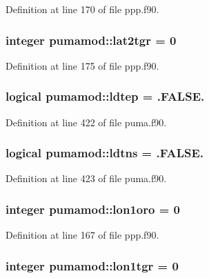 \-Definition at line 170 of file ppp.\-f90.

\hypertarget{classpumamod_a3f3522edc6079ba74938bdcf2a780610}{
\subsubsection[{lat2tgr}]{\setlength{\rightskip}{0pt plus 5cm}integer {\bf pumamod\-::lat2tgr} = 0}}
\label{classpumamod_a3f3522edc6079ba74938bdcf2a780610}


\-Definition at line 175 of file ppp.\-f90.

\hypertarget{classpumamod_ad6ef8c9bbafbe30d455ecbedd0091142}{
\subsubsection[{ldtep}]{\setlength{\rightskip}{0pt plus 5cm}logical {\bf pumamod\-::ldtep} = .\-F\-A\-L\-S\-E.}}
\label{classpumamod_ad6ef8c9bbafbe30d455ecbedd0091142}


\-Definition at line 422 of file puma.\-f90.

\hypertarget{classpumamod_ad987421134978995be7290187c82fda2}{
\subsubsection[{ldtns}]{\setlength{\rightskip}{0pt plus 5cm}logical {\bf pumamod\-::ldtns} = .\-F\-A\-L\-S\-E.}}
\label{classpumamod_ad987421134978995be7290187c82fda2}


\-Definition at line 423 of file puma.\-f90.

\hypertarget{classpumamod_a1f0d5ea8b0f0de798929e63bb5904e86}{
\subsubsection[{lon1oro}]{\setlength{\rightskip}{0pt plus 5cm}integer {\bf pumamod\-::lon1oro} = 0}}
\label{classpumamod_a1f0d5ea8b0f0de798929e63bb5904e86}


\-Definition at line 167 of file ppp.\-f90.

\hypertarget{classpumamod_a5413d20acb64106fee3e0b8cd6b99efd}{
\subsubsection[{lon1tgr}]{\setlength{\rightskip}{0pt plus 5cm}integer {\bf pumamod\-::lon1tgr} = 0}}
\label{classpumamod_a5413d20acb64106fee3e0b8cd6b99efd}


